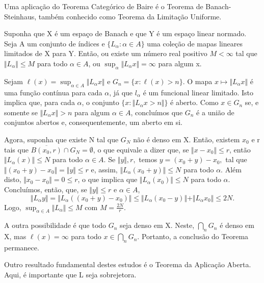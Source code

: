 \documentclass[MeasureTheory/measure_theory.tex]{subfiles}
\begin{document}
Uma aplicação do Teorema Categórico de Baire é o Teorema de Banach-Steinhaus, também conhecido como Teorema da Limitação Uniforme.
\hypertarget{banach_steinhauss}{
	\begin{theorem*}
		Suponha que X é um espaço de Banach e que Y é um espaço linear normado. Seja A um conjunto de índices e \(\{L_{\alpha }: \alpha \in A \}\) uma coleção de mapas lineares limitados de X para Y. Então, ou existe
		um número real positivo \(M<\infty\) tal que \(\Vert L_{\alpha } \Vert\leq M\) para todo \(\alpha \in A\), ou \(\sup_{\alpha }\Vert L_{\alpha }x \Vert = \infty\) para algum x.
	\end{theorem*}
}
\begin{proof*}
	Sejam \(\ell (x) = \sup_{\alpha \in A}\Vert L_{\alpha }x \Vert\) e \(G_{n} = \{x:\ell (x) > n\}\). O mapa \(x\mapsto \Vert L_{\alpha }x \Vert\) é uma função contínua para cada \(\alpha \), já que \(l_{\alpha }\) é um funcional linear limitado. Isto implica que, para cada \(\alpha \), o conjunto
	\(\{x: \Vert L_{\alpha }x > n\Vert\}\) é aberto. Como \(x\in G_{n}\) se, e somente se \(\Vert L_{\alpha }x \Vert > n\) para algum \(\alpha \in A\), concluímos que \(G_{n}\) é a união de conjuntos abertos e, consequentemente, um aberto em si.

	Agora, suponha que existe N tal que \(G_{N}\) não é denso em X. Então, existem \(x_{0}\) e r tais que \(\overline{B(x_{0}, r)}\cap G_{N} = \emptyset \), o que equivale a dizer que, se \(\Vert x-x_{0} \Vert\leq r\), então \(\Vert L_{\alpha }(x) \Vert\leq N\) para todo \(\alpha \in A\).
	Se \(\Vert y \Vert, r,\) temos \(y=(x_{0}+y) - x_{0},\) tal que \(\Vert (x_{0}+y) - x_{0} \Vert = \Vert y \Vert\leq r\) e, assim, \(\Vert L_{\alpha }(x_{0} + y) \Vert\leq N\) para todo \(\alpha \). Além disto, \(\Vert x_{0}-x_{0} \Vert = 0 \leq r\), o que implica que \(\Vert L_{\alpha }(x_{0}) \Vert\leq N\) para todo \(\alpha \).
	Concluímos, então, que, se \(\Vert y \Vert\leq r\) e \(\alpha \in A\),
	\[
		\Vert L_{\alpha }y \Vert = \Vert L_{\alpha }((x_{0}+y) - x_{0}) \Vert\leq \Vert L_{\alpha }(x_{0}-y) \Vert + \Vert L_{\alpha }x_{0} \Vert\leq 2N.
	\]
	Logo, \(\sup_{\alpha \in A}\Vert L_{\alpha } \Vert\leq M\) com \(M = \frac{2N}{r}\).

	A outra possibilidade é que todo \(G_{n}\) seja denso em X. Neste, \(\bigcap_{n}^{}G_{n}\) é denso em X, mas \(\ell (x) = \infty\) para todo \(x\in \bigcap_{n}^{}G_{n}\). Portanto, a conclusão do Teorema permanece. \qedsymbol
\end{proof*}
Outro resultado fundamental destes estudos é o Teorema da Aplicação Aberta. Aqui, é importante que L seja sobrejetora.
\end{document}
